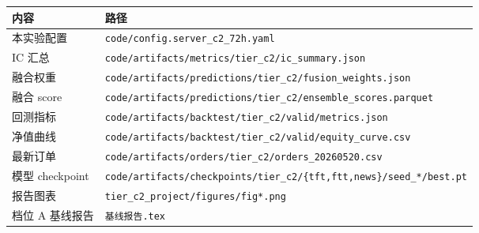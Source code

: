 \documentclass[UTF8,a4paper,12pt]{ctexart}
\begin{document}
\begin{table}[H]
\centering
\small
\begin{tabular}{ll}
\toprule
\textbf{内容} & \textbf{路径} \\
\midrule
本实验配置 & \texttt{code/config.server\_c2\_72h.yaml} \\
IC 汇总 & \texttt{code/artifacts/metrics/tier\_c2/ic\_summary.json} \\
融合权重 & \texttt{code/artifacts/predictions/tier\_c2/fusion\_weights.json} \\
融合 score & \texttt{code/artifacts/predictions/tier\_c2/ensemble\_scores.parquet} \\
回测指标 & \texttt{code/artifacts/backtest/tier\_c2/valid/metrics.json} \\
净值曲线 & \texttt{code/artifacts/backtest/tier\_c2/valid/equity\_curve.csv} \\
最新订单 & \texttt{code/artifacts/orders/tier\_c2/orders\_20260520.csv} \\
模型 checkpoint & \texttt{code/artifacts/checkpoints/tier\_c2/\{tft,ftt,news\}/seed\_*/best.pt} \\
报告图表 & \texttt{tier\_c2\_project/figures/fig*.png} \\
档位 A 基线报告 & \texttt{基线报告.tex} \\
\bottomrule
\end{tabular}
\end{table}
\end{document}
